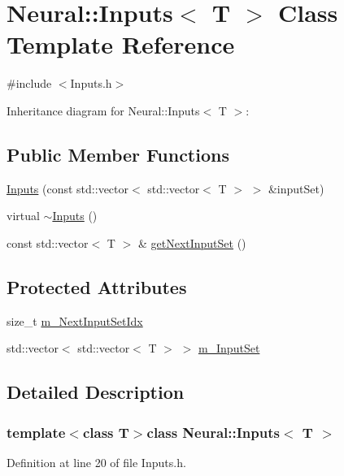 \hypertarget{class_neural_1_1_inputs}{
\section{Neural::Inputs$<$ T $>$ Class Template Reference}
\label{class_neural_1_1_inputs}
}


{\ttfamily \#include $<$Inputs.h$>$}



Inheritance diagram for Neural::Inputs$<$ T $>$:
\subsection*{Public Member Functions}
\begin{DoxyCompactItemize}
\item 
\hyperlink{class_neural_1_1_inputs_a469f17d3397ee3a1a91215f468c86a7a}{Inputs} (const std::vector$<$ std::vector$<$ T $>$ $>$ \&inputSet)
\item 
virtual \hyperlink{class_neural_1_1_inputs_ad41c09121babd75a89f757e9c1cfe9c0}{$\sim$Inputs} ()
\item 
const std::vector$<$ T $>$ \& \hyperlink{class_neural_1_1_inputs_a32891b0502121ad64c3c0d0e8e7fd8f8}{getNextInputSet} ()
\end{DoxyCompactItemize}
\subsection*{Protected Attributes}
\begin{DoxyCompactItemize}
\item 
size\_\-t \hyperlink{class_neural_1_1_inputs_a238e762efd4eba33f84715447970ece9}{m\_\-NextInputSetIdx}
\item 
std::vector$<$ std::vector$<$ T $>$ $>$ \hyperlink{class_neural_1_1_inputs_ad0283c807ff169eb9ebf3a7603ef3ccf}{m\_\-InputSet}
\end{DoxyCompactItemize}


\subsection{Detailed Description}
\subsubsection*{template$<$class T$>$class Neural::Inputs$<$ T $>$}



Definition at line 20 of file Inputs.h.



